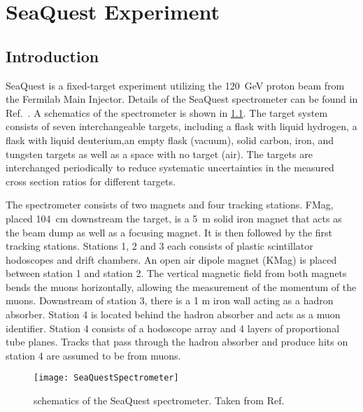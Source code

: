 \documentclass[../main.tex]{subfiles}
\begin{document}
\ifSubfilesClassLoaded{
	\mainmatter
	\setcounter{chapter}{3}
}{}

\chapter{SeaQuest Experiment}
\label{ch:seaquest}

\section{Introduction}
SeaQuest is a fixed-target experiment utilizing the \SI{120}{\GeV} proton beam
from the Fermilab Main Injector. Details of the SeaQuest spectrometer can be
found in Ref.~\cite{aidala2019}. A schematics of the spectrometer is shown in
\cref{fig:spectrometer}. The target system consists of seven
interchangeable targets, including a flask with liquid hydrogen, a flask with
liquid deuterium,an empty flask (vacuum), solid carbon, iron, and tungsten
targets as well as a space with no target (air). The targets are interchanged
periodically to reduce systematic uncertainties in the measured cross section
ratios for different targets.

The spectrometer consists of two magnets and four tracking stations. FMag,
placed \SI{104}{\cm} downstream the target, is a \SI{5}{\m} solid iron magnet
that acts as the beam dump as well as a focusing magnet. It is then followed by
the first tracking stations. Stations 1, 2 and 3 each consists of plastic
scintillator hodoscopes and drift chambers. An open air dipole magnet (KMag) is
placed between station 1 and station 2. The vertical magnetic field from both
magnets bends the muons horizontally, allowing the measurement of the momentum
of the muons. Downstream of station 3, there is a 1 m iron wall acting as a
hadron absorber. Station 4 is located behind the hadron absorber and acts as a
muon identifier. Station 4 consists of a hodoscope array and 4 layers of
proportional tube planes. Tracks that pass through the hadron absorber and
produce hits on station 4 are assumed to be from muons.

\begin{figure}[htbp!]
	\centering
	\texttt{[image: SeaQuestSpectrometer]}
	\caption{schematics of the SeaQuest spectrometer. Taken from Ref.~\cite{aidala2019}}
	\label{fig:spectrometer}
\end{figure}
\end{document}
